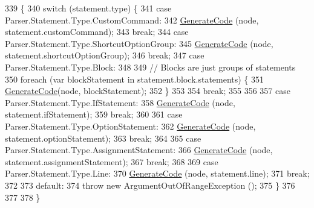 \begin{DoxyCode}
339                                                                  \{
340             \textcolor{keywordflow}{switch} (statement.type) \{
341             \textcolor{keywordflow}{case} Parser.Statement.Type.CustomCommand:
342                 \hyperlink{a00029_a006f3becd521cc179ba3d3352f6f930b}{GenerateCode} (node, statement.customCommand);
343                 \textcolor{keywordflow}{break};
344             \textcolor{keywordflow}{case} Parser.Statement.Type.ShortcutOptionGroup:
345                 \hyperlink{a00029_a006f3becd521cc179ba3d3352f6f930b}{GenerateCode} (node, statement.shortcutOptionGroup);
346                 \textcolor{keywordflow}{break};
347             \textcolor{keywordflow}{case} Parser.Statement.Type.Block:
348                 
349                 \textcolor{comment}{// Blocks are just groups of statements}
350                 \textcolor{keywordflow}{foreach} (var blockStatement \textcolor{keywordflow}{in} statement.block.statements) \{
351                     \hyperlink{a00029_a006f3becd521cc179ba3d3352f6f930b}{GenerateCode}(node, blockStatement);
352                 \}
353 
354                 \textcolor{keywordflow}{break};
355 
356 
357             \textcolor{keywordflow}{case} Parser.Statement.Type.IfStatement:
358                 \hyperlink{a00029_a006f3becd521cc179ba3d3352f6f930b}{GenerateCode} (node, statement.ifStatement);
359                 \textcolor{keywordflow}{break};
360 
361             \textcolor{keywordflow}{case} Parser.Statement.Type.OptionStatement:
362                 \hyperlink{a00029_a006f3becd521cc179ba3d3352f6f930b}{GenerateCode} (node, statement.optionStatement);
363                 \textcolor{keywordflow}{break};
364 
365             \textcolor{keywordflow}{case} Parser.Statement.Type.AssignmentStatement:
366                 \hyperlink{a00029_a006f3becd521cc179ba3d3352f6f930b}{GenerateCode} (node, statement.assignmentStatement);
367                 \textcolor{keywordflow}{break};
368 
369             \textcolor{keywordflow}{case} Parser.Statement.Type.Line:
370                 \hyperlink{a00029_a006f3becd521cc179ba3d3352f6f930b}{GenerateCode} (node, statement.line);
371                 \textcolor{keywordflow}{break};
372 
373             \textcolor{keywordflow}{default}:
374                 \textcolor{keywordflow}{throw} \textcolor{keyword}{new} ArgumentOutOfRangeException ();
375             \}
376 
377 
378         \}
\end{DoxyCode}
